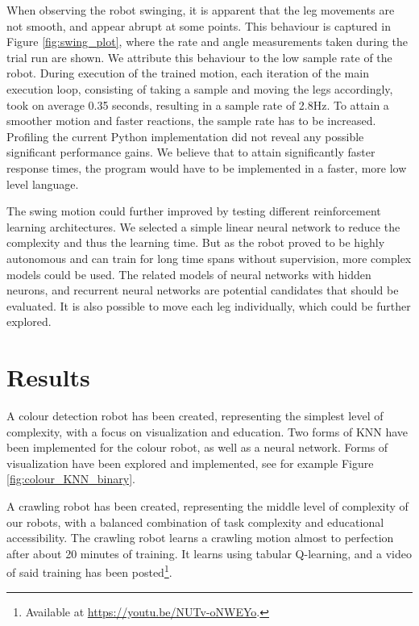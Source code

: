 \documentclass[11pt, a4paper]{article}
\begin{document}
	\medskip
	
	When observing the robot swinging, it is apparent that the leg movements are not smooth, and appear abrupt at some points. This behaviour is captured in Figure \ref{fig:swing_plot}, where the rate and angle measurements taken during the trial run are shown. We attribute this behaviour to the low sample rate of the robot. During execution of the trained motion, each iteration of the main execution loop, consisting of taking a sample and moving the legs accordingly, took on average 0.35 seconds, resulting in a sample rate of 2.8Hz. To attain a smoother motion and faster reactions, the sample rate has to be increased. Profiling the current Python implementation did not reveal any possible significant performance gains. We believe that to attain significantly faster response times, the program would have to be implemented in a faster, more low level language.
	
	\medskip
	The swing motion could further improved by testing different reinforcement learning architectures. We selected a simple linear neural network to reduce the complexity and thus the learning time. But as the robot proved to be highly autonomous and can train for long time spans without supervision, more complex models could be used. The related models of neural networks with hidden neurons, and recurrent neural networks are potential candidates that should be evaluated. It is also possible to move each leg individually, which could be further explored.
	
	
	
	\section{Results}
	A colour detection robot has been created, representing the simplest level of complexity, with a focus on visualization and education. Two forms of KNN have been implemented for the colour robot, as well as a neural network. Forms of visualization have been explored and implemented, see for example Figure \ref{fig:colour_KNN_binary}.
	\medskip
	
	A crawling robot has been created, representing the middle level of complexity of our robots, with a balanced combination of task complexity and educational accessibility. The crawling robot learns a crawling motion almost to perfection after about 20 minutes of training. It learns using tabular Q-learning, and a video of said training has been posted\footnote{Available at \url{https://youtu.be/NUTv-oNWEYo}.}.
	\medskip
	
\end{document}

